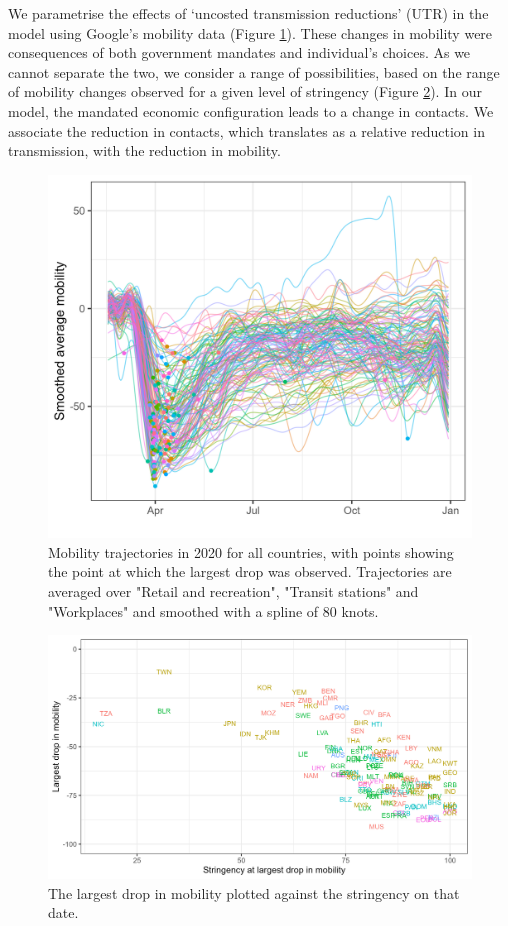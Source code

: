 \documentclass[
]{article}
\begin{document}
We parametrise the effects of `uncosted transmission reductions' (UTR) in the model using Google's mobility data (Figure \ref{fig:smoothmobility}). These changes in mobility were consequences of both government mandates and individual's choices. As we cannot separate the two, we consider a range of possibilities, based on the range of mobility changes observed for a given level of stringency (Figure \ref{fig:mobilitydrop}). In our model, the mandated economic configuration leads to a change in contacts. We associate the reduction in contacts, which translates as a relative reduction in transmission, with the reduction in mobility.

\begin{figure}
\includegraphics[width=0.5\linewidth]{README_files/figure-gfm/smoothmobility} \caption{Mobility trajectories in 2020 for all countries, with points showing the point at which the largest drop was observed. Trajectories are averaged over "Retail and recreation", "Transit stations" and "Workplaces" and smoothed with a spline of 80 knots.}\label{fig:smoothmobility}
\end{figure}

\begin{figure}
\includegraphics[width=0.5\linewidth]{README_files/figure-gfm/mobilitydrop} \caption{The largest drop in mobility plotted against the stringency on that date.}\label{fig:mobilitydrop}
\end{figure}
\end{document}

